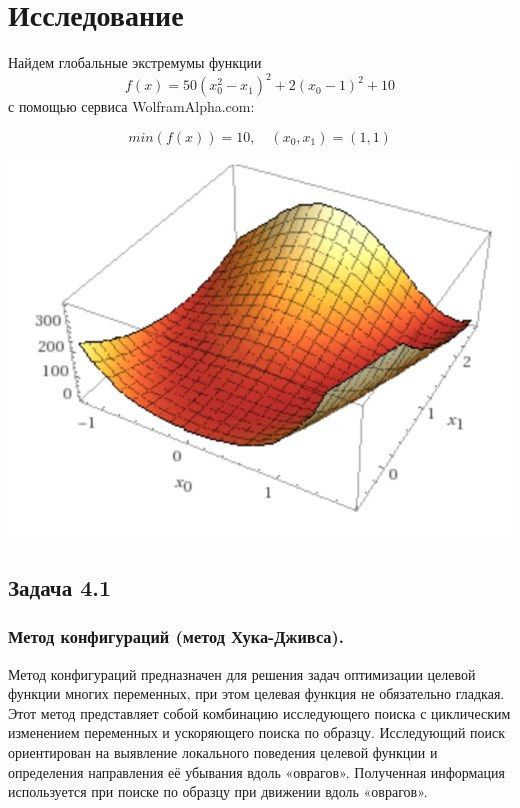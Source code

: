 \documentclass[a4paper, 12pt]{article}   	%
\begin{document}
\newpage
\section{Исследование}
    Найдем глобальные экстремумы функции 
    \begin{equation}
         f(x) = 50(x_0^2 - x_1)^2 + 2(x_0 - 1)^2 + 10
    \end{equation}
    с помощью сервиса WolframAlpha.com:
    
     \begin{equation}
        min(f(x)) = 10,\quad (x_0, x_1) = (1, 1)
    \end{equation}
    
    \begin{center}
        \begin{minipage}{0.7\linewidth}
            \includegraphics[width=\linewidth]{img/function}
        \end{minipage}
    \end{center}
    
\subsection{Задача 4.1}

\subsubsection{Метод конфигураций (метод Хука-Дживса).}
    Метод конфигураций предназначен для решения задач оптимизации целевой функции многих переменных, при этом целевая функция не обязательно гладкая. Этот метод представляет собой комбинацию исследующего поиска с циклическим изменением переменных и ускоряющего поиска по образцу. Исследующий поиск ориентирован на выявление локального поведения целевой функции и определения направления её убывания вдоль «оврагов». Полученная информация используется при поиске по образцу при движении вдоль «оврагов».
    
\end{document}
